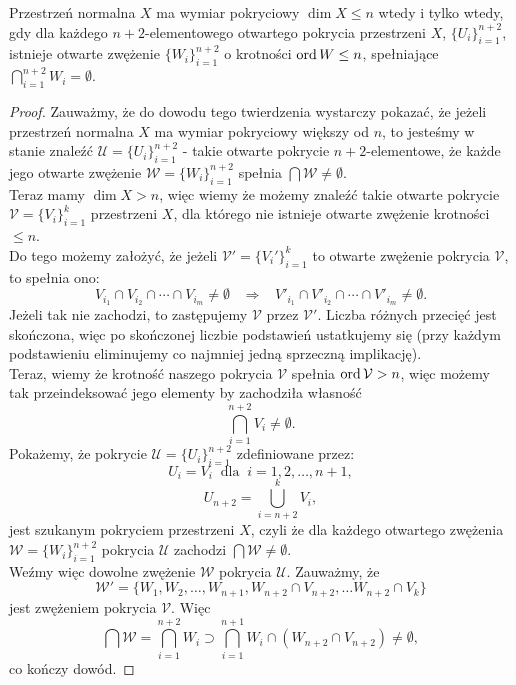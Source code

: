 \begin{twie} %
    Przestrzeń normalna $X$ ma wymiar pokryciowy $\dim X \leq n $ wtedy i tylko wtedy, gdy dla każdego $n+2$-elementowego otwartego pokrycia przestrzeni $X$, $\{U_i\} _{i=1}^{n+2}$, istnieje otwarte zwężenie $ \{W_i\} _{i=1}^{n+2}$ o krotności $\operatorname{ord} W\le n$, spełniające $\bigcap_{i=1}^{n+2} W_i = \emptyset$.
\end{twie}
\begin{proof}
    Zauważmy, że do dowodu tego twierdzenia wystarczy pokazać, że jeżeli przestrzeń normalna $X$ ma wymiar pokryciowy większy od $n$, to jesteśmy w stanie znaleźć $\mathcal{U}=\{U_i\}_{i=1}^{n+2}$ - takie otwarte pokrycie $n+2$-elementowe, że każde jego otwarte zwężenie $\mathcal{W}=\{W_i\}_{i=1}^{n+2}$ spełnia $\bigcap\mathcal{W}\ne \emptyset$.\\
    Teraz mamy $\dim X>n$, więc wiemy że możemy znaleźć takie otwarte pokrycie $\mathcal{V}=\{V_i\}_{i=1}^{k}$ przestrzeni $X$, dla którego nie istnieje otwarte zwężenie krotności $\le n$. \\
    Do tego możemy założyć, że jeżeli $\mathcal{V}' = \{V_i'\}_{i=1}^k$ to otwarte zwężenie pokrycia $\mathcal{V}$, to spełnia ono: 
    \[V_{i_1}\cap V_{i_2} \cap \cdots \cap V_{i_m} \ne \emptyset\;\;\;\Rightarrow\;\;\;
    V'_{i_1}\cap V'_{i_2} \cap \cdots \cap V'_{i_m} \ne \emptyset.\]
    Jeżeli tak nie zachodzi, to zastępujemy $\mathcal{V}$ przez $\mathcal{V'}$. Liczba różnych przecięć jest skończona, więc po skończonej liczbie podstawień ustatkujemy się (przy każdym podstawieniu eliminujemy co najmniej jedną sprzeczną implikację).\\
    Teraz, wiemy że krotność naszego pokrycia $\mathcal{V}$ spełnia $\operatorname{ord}\mathcal{V}>n$, więc możemy tak przeindeksować jego elementy by zachodziła własność
    \[\bigcap_{i=1}^{n+2} V_i\ne \emptyset.\]
    Pokażemy, że pokrycie $\mathcal{U} = \{U_i\}_{i=1}^{n+2}$ zdefiniowane przez:
    \[U_i=V_i\;\; \mathrm{dla}\;\; i=1,2,\ldots,n+1,\]
    \[U_{n+2}= \bigcup _{i=n+2}^kV_i,\]
    jest szukanym pokryciem przestrzeni $X$, czyli że dla każdego otwartego zwężenia $\mathcal{W}=\{W_i\}_{i=1}^{n+2}$ pokrycia $\mathcal{U}$ zachodzi $\bigcap\mathcal{W}\ne \emptyset$.\\
    Weźmy więc dowolne zwężenie $\mathcal{W}$ pokrycia $\mathcal{U}$. Zauważmy, że
    \[\mathcal{W'}=\{W_1, W_2, \ldots, W_{n+1}, W_{n+2}\cap V_{n+2}, \ldots W_{n+2}\cap V_{k}\}  \]
    jest zwężeniem pokrycia $\mathcal{V}$. Więc
    \[\bigcap\mathcal{W} = \bigcap_{i=1}^{n+2}W_i\supset \bigcap_{i=1}^{n+1}W_i\cap (W_{n+2}\cap V_{n+2}) \ne \emptyset,\]
    co kończy dowód.
\end{proof}

